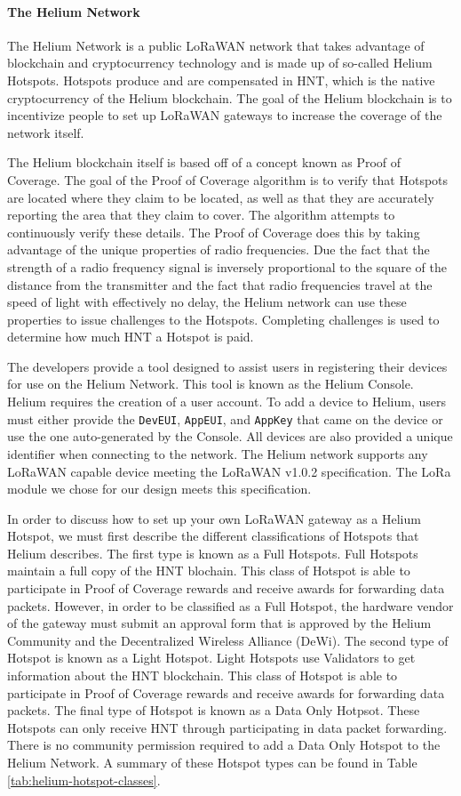 \paragraph{The Helium Network}
The Helium Network is a public LoRaWAN network that takes advantage of blockchain and cryptocurrency technology and is made up of so-called Helium Hotspots. Hotspots produce and are compensated in HNT, which is the native cryptocurrency of the Helium blockchain. The goal of the Helium blockchain is to incentivize people to set up LoRaWAN gateways to increase the coverage of the network itself.

The Helium blockchain itself is based off of a concept known as Proof of Coverage. The goal of the Proof of Coverage algorithm is to verify that Hotspots are located where they claim to be located, as well as that they are accurately reporting the area that they claim to cover. The algorithm attempts to continuously verify these details. The Proof of Coverage does this by taking advantage of the unique properties of radio frequencies. Due the fact that the strength of a radio frequency signal is inversely proportional to the square of the distance from the transmitter and the fact that radio frequencies travel at the speed of light with effectively no delay, the Helium network can use these properties to issue challenges to the Hotspots. Completing challenges is used to determine how much HNT a Hotspot is paid.

The developers provide a tool designed to assist users in registering their devices for use on the Helium Network. This tool is known as the Helium Console. Helium requires the creation of a user account. To add a device to Helium, users must either provide the \texttt{DevEUI}, \texttt{AppEUI}, and \texttt{AppKey} that came on the device or use the one auto-generated by the Console. All devices are also provided a unique identifier when connecting to the network. The Helium network supports any LoRaWAN capable device meeting the LoRaWAN v1.0.2 specification. The LoRa module we chose for our design meets this specification.

In order to discuss how to set up your own LoRaWAN gateway as a Helium Hotspot, we must first describe the different classifications of Hotspots that Helium describes. The first type is known as a Full Hotspots. Full Hotspots maintain a full copy of the HNT blochain. This class of Hotspot is able to participate in Proof of Coverage rewards and receive awards for forwarding data packets. However, in order to be classified as a Full Hotspot, the hardware vendor of the gateway must submit an approval form that is approved by the Helium Community and the Decentralized Wireless Alliance (DeWi). The second type of Hotspot is known as a Light Hotspot. Light Hotspots use Validators to get information about the HNT blockchain. This class of Hotspot is able to participate in Proof of Coverage rewards and receive awards for forwarding data packets. The final type of Hotspot is known as a Data Only Hotpsot. These Hotspots can only receive HNT through participating in data packet forwarding. There is no community permission required to add a Data Only Hotspot to the Helium Network. A summary of these Hotspot types can be found in Table \ref{tab:helium-hotspot-classes}.

